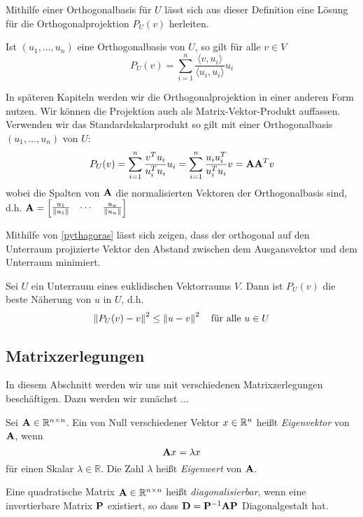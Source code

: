 Mithilfe einer Orthogonalbasis für $U$ lässt sich aus dieser Definition eine Lösung für die Orthogonalprojektion $P_U(v)$ herleiten.

\begin{thm}
Ist $(u_1, \ldots, u_n)$ eine Orthogonalbasis von $U$, so gilt für alle $v \in V$
$$P_{U}(v) = \sum_{i=1}^n \frac{\langle v, u_i \rangle}{\langle u_i, u_i \rangle} u_i$$
\end{thm}

In späteren Kapiteln werden wir die Orthogonalprojektion in einer anderen Form nutzen. Wir können die Projektion auch als Matrix-Vektor-Produkt auffassen. Verwenden wir das Standardskalarprodukt so gilt mit einer Orthogonalbasis $(u_1, \ldots, u_n)$ von $U$:
$$P_U(v) = \sum_{i=1}^n \frac{v^T u_i}{u_i^T u_i} u_i = \sum_{i=1}^n \frac{u_i u_i^T}{u_i^T u_i}v = \mathbf{A} \mathbf{A}^T v$$
wobei die Spalten von $\mathbf{A}$ die normalisierten Vektoren der Orthogonalbasis sind, d.h. $\mathbf{A} = \begin{bmatrix} \frac{u_1}{\left\lVert u_1 \right\rVert} & \cdots & \frac{u_n}{\left\lVert u_n \right\rVert} \end{bmatrix}$

Mithilfe von \ref{pythagoras} lässt sich zeigen, dass der orthogonal auf den Unterraum projizierte Vektor den Abstand zwischen dem Ausgansvektor und dem Unterraum minimiert.

\begin{thm}
Sei $U$ ein Unterraum eines euklidischen Vektorraums $V$. Dann ist $P_U(v)$ die beste Näherung von $u$ in $U$, d.h.
$$\left\lVert P_U(v) - v \right\rVert^2 \leq \left\lVert u - v \right\rVert^2 \quad \text{für alle } u \in U$$
\end{thm}


\subsection{Matrixzerlegungen}

In diesem Abschnitt werden wir uns mit verschiedenen Matrixzerlegungen beschäftigen. Dazu werden wir zunächst ...

\begin{defn}
Sei $\mathbf{A} \in \mathbb{R}^{n \times n}$. Ein von Null verschiedener Vektor $x \in \mathbb{R}^n$ heißt \textit{Eigenvektor} von $\mathbf{A}$, wenn
$$\mathbf{A}x = \lambda x$$
für einen Skalar $\lambda \in \mathbb{R}$. Die Zahl $\lambda$ heißt \textit{Eigenwert} von $\mathbf{A}$.
\end{defn}

\begin{defn}
Eine quadratische Matrix $\mathbf{A} \in \mathbb{R}^{n \times n}$ heißt \textit{diagonalisierbar}, wenn eine invertierbare Matrix $\mathbf{P}$ existiert, so dass $\mathbf{D} = \mathbf{P}^{-1}\mathbf{A}\mathbf{P}$ Diagonalgestalt hat.
\end{defn}


